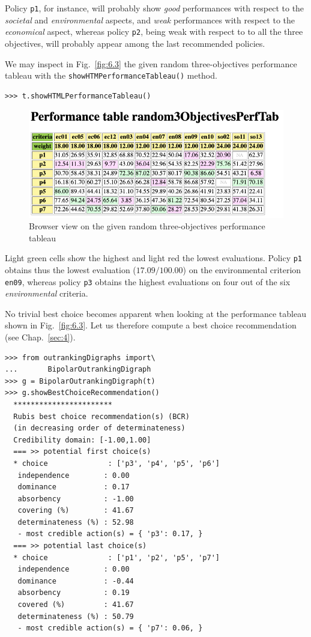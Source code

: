 Policy \texttt{p1}, for instance, will probably show \emph{good} performances with respect to the \emph{societal} and \emph{environmental} aspects, and \emph{weak} performances with respect to the \emph{economical} aspect, whereas policy \texttt{p2}, being weak with respect to to all the three objectives, will probably appear among the last recommended policies.

We may inspect in Fig.~\vref{fig:6.3} the given random three-objectives performance tableau with the \texttt{showHTMPerformanceTableau()} method.
\begin{lstlisting}
>>> t.showHTMLPerformanceTableau()
\end{lstlisting}
\begin{figure}[ht]
\includegraphics[width=\hsize]{Figures/6-3-random3ObjPerfTab.png}
\caption{Browser view on the given random three-objectives performance tableau}
\label{fig:6.3}       %
\end{figure}

Light green cells show the highest and light red the lowest evaluations. Policy \texttt{p1} obtains thus the lowest evaluation ($17.09/100.00$) on the environmental criterion \texttt{en09}, whereas policy \texttt{p3} obtains the highest evaluations on four out of the six \emph{environmental} criteria.

No trivial best choice becomes apparent when looking at the performance tableau shown in Fig.~\vref{fig:6.3}. Let us therefore compute a \Rubis best choice recommendation (see Chap.~\ref{sec:4}).
\begin{lstlisting}[caption={What is the public policy to recommend as best choice ?},label=list:6.5]
>>> from outrankingDigraphs import\
...       BipolarOutrankingDigraph
>>> g = BipolarOutrankingDigraph(t)
>>> g.showBestChoiceRecommendation()
  ***********************
  Rubis best choice recommendation(s) (BCR)
  (in decreasing order of determinateness)   
  Credibility domain: [-1.00,1.00]
  === >> potential first choice(s)
  * choice              : ['p3', 'p4', 'p5', 'p6']
   independence        : 0.00
   dominance           : 0.17
   absorbency          : -1.00
   covering (%)        : 41.67
   determinateness (%) : 52.98
   - most credible action(s) = { 'p3': 0.17, }
  === >> potential last choice(s) 
  * choice              : ['p1', 'p2', 'p5', 'p7']
   independence        : 0.00
   dominance           : -0.44
   absorbency          : 0.19
   covered (%)         : 41.67
   determinateness (%) : 50.79
   - most credible action(s) = { 'p7': 0.06, }
\end{lstlisting}

